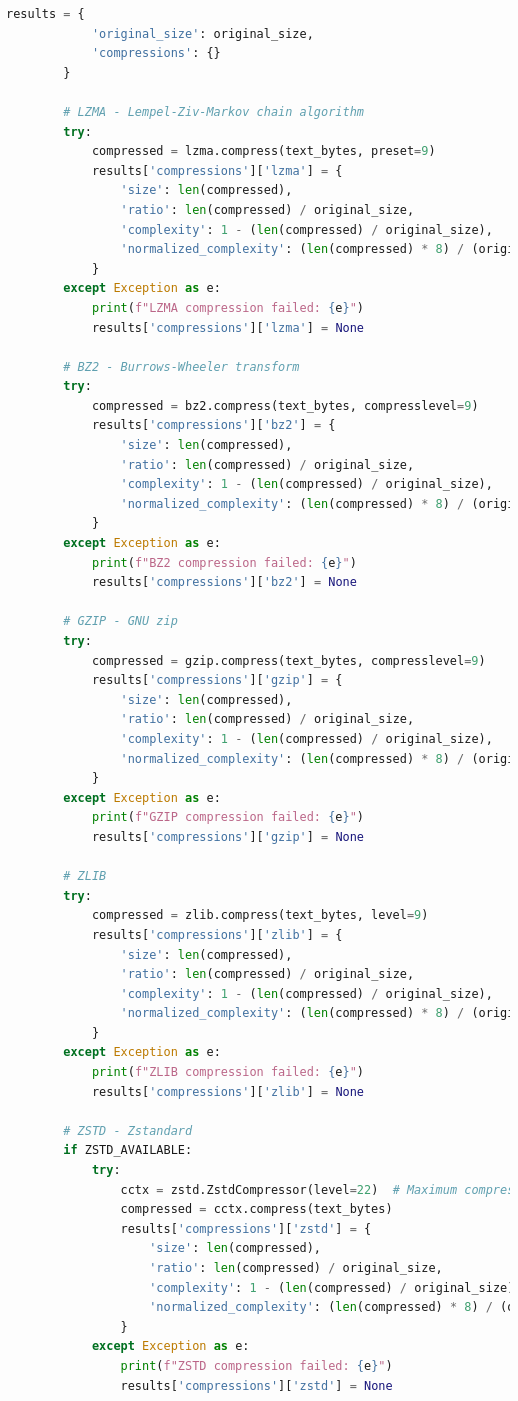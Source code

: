 \documentclass[12pt,a4paper]{report}
\begin{document}
\begin{lstlisting}[language=Python, caption=Complete Compression Analysis Framework]
        results = {
            'original_size': original_size,
            'compressions': {}
        }

        # LZMA - Lempel-Ziv-Markov chain algorithm
        try:
            compressed = lzma.compress(text_bytes, preset=9)
            results['compressions']['lzma'] = {
                'size': len(compressed),
                'ratio': len(compressed) / original_size,
                'complexity': 1 - (len(compressed) / original_size),
                'normalized_complexity': (len(compressed) * 8) / (original_size * 8)
            }
        except Exception as e:
            print(f"LZMA compression failed: {e}")
            results['compressions']['lzma'] = None

        # BZ2 - Burrows-Wheeler transform
        try:
            compressed = bz2.compress(text_bytes, compresslevel=9)
            results['compressions']['bz2'] = {
                'size': len(compressed),
                'ratio': len(compressed) / original_size,
                'complexity': 1 - (len(compressed) / original_size),
                'normalized_complexity': (len(compressed) * 8) / (original_size * 8)
            }
        except Exception as e:
            print(f"BZ2 compression failed: {e}")
            results['compressions']['bz2'] = None

        # GZIP - GNU zip
        try:
            compressed = gzip.compress(text_bytes, compresslevel=9)
            results['compressions']['gzip'] = {
                'size': len(compressed),
                'ratio': len(compressed) / original_size,
                'complexity': 1 - (len(compressed) / original_size),
                'normalized_complexity': (len(compressed) * 8) / (original_size * 8)
            }
        except Exception as e:
            print(f"GZIP compression failed: {e}")
            results['compressions']['gzip'] = None

        # ZLIB
        try:
            compressed = zlib.compress(text_bytes, level=9)
            results['compressions']['zlib'] = {
                'size': len(compressed),
                'ratio': len(compressed) / original_size,
                'complexity': 1 - (len(compressed) / original_size),
                'normalized_complexity': (len(compressed) * 8) / (original_size * 8)
            }
        except Exception as e:
            print(f"ZLIB compression failed: {e}")
            results['compressions']['zlib'] = None

        # ZSTD - Zstandard
        if ZSTD_AVAILABLE:
            try:
                cctx = zstd.ZstdCompressor(level=22)  # Maximum compression
                compressed = cctx.compress(text_bytes)
                results['compressions']['zstd'] = {
                    'size': len(compressed),
                    'ratio': len(compressed) / original_size,
                    'complexity': 1 - (len(compressed) / original_size),
                    'normalized_complexity': (len(compressed) * 8) / (original_size * 8)
                }
            except Exception as e:
                print(f"ZSTD compression failed: {e}")
                results['compressions']['zstd'] = None


\end{lstlisting}
\end{document}

